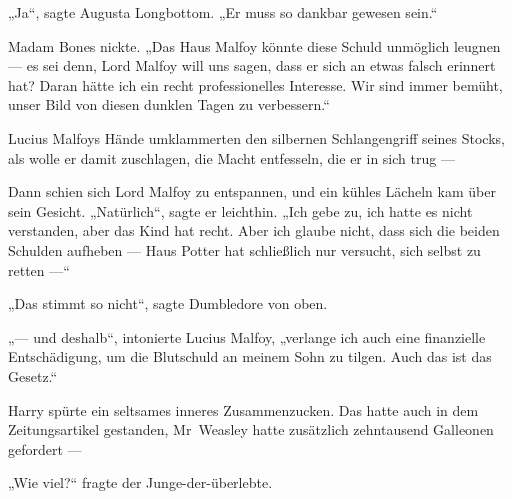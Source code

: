 „Ja“, sagte Augusta Longbottom.
„Er muss so dankbar gewesen sein.“

Madam Bones nickte.
„Das Haus Malfoy könnte diese Schuld unmöglich leugnen — es sei denn, Lord Malfoy will uns sagen, dass er sich an etwas falsch erinnert hat? Daran hätte ich ein recht professionelles Interesse. Wir sind immer bemüht, unser Bild von diesen dunklen Tagen zu verbessern.“

Lucius Malfoys Hände umklammerten den silbernen Schlangengriff seines Stocks, als wolle er damit zuschlagen, die Macht entfesseln, die er in sich trug —

Dann schien sich Lord Malfoy zu entspannen, und ein kühles Lächeln kam über sein Gesicht.
„Natürlich“, sagte er leichthin.
„Ich gebe zu, ich hatte es nicht verstanden, aber das Kind hat recht. Aber ich glaube nicht, dass sich die beiden Schulden aufheben — Haus Potter hat schließlich nur versucht, sich selbst zu retten —“

„Das stimmt so nicht“, sagte Dumbledore von oben.

„— und deshalb“, intonierte Lucius Malfoy, „verlange ich auch eine finanzielle Entschädigung, um die Blutschuld an meinem Sohn zu tilgen. Auch das ist das Gesetz.“

Harry spürte ein seltsames inneres Zusammenzucken. Das hatte auch in dem Zeitungsartikel gestanden, Mr~Weasley hatte zusätzlich zehntausend Galleonen gefordert —

„Wie viel?“ fragte der Junge-der-überlebte.

